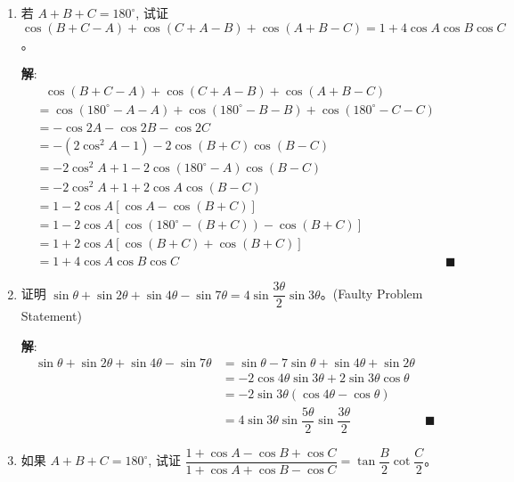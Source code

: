 \documentclass{report}
\newcommand{\sol}{\vspace{0.2cm}\textbf{解}:}
\begin{document}
\begin{enumerate}[leftmargin=*]
    \newpage
    \item 若 ${A}+{B}+{C}=180^{\circ}$, 试证 $\cos (B+C-A)+\cos (C+A-B)+\cos (A+B-C)=1+4 \cos A \cos B \cos C$。
    
    \sol{}
    \begin{align*}
       &\ \ \ \cos (B+C-A)+\cos (C+A-B)+\cos (A+B-C) \\
        &= \cos (180^{\circ}-A - A) + \cos (180^{\circ}-B - B) + \cos (180^{\circ}-C - C) \\
        & = -\cos 2A - \cos 2B - \cos 2C \\
        & = -(2\cos^2 A - 1) - 2\cos(B+C)\cos(B-C) \\
        & = -2\cos^2 A + 1 - 2\cos(180^{\circ}-A)\cos(B-C) \\
        & = -2\cos^2 A + 1 + 2\cos A\cos(B-C) \\
        & = 1 - 2\cos A[\cos A - \cos(B+C)] \\
        & = 1 - 2\cos A[\cos (180^{\circ}-(B+C)) - \cos(B+C)] \\
        & = 1 + 2\cos A[\cos(B+C) + \cos(B+C)] \\
        & = 1 + 4\cos A\cos B\cos C &\blacksquare
    \end{align*}
    \item 证明 $\sin \theta+\sin 2 \theta+\sin 4 \theta-\sin 7 \theta=4 \sin \dfrac{3 \theta}{2} \sin 3 \theta$。(Faulty Problem Statement)
    
    \sol{}
    \begin{align*}
        \sin \theta+\sin 2 \theta+\sin 4 \theta-\sin 7 \theta &= \sin \theta - 7\sin \theta + \sin 4\theta + \sin 2\theta \\
        & = -2\cos 4\theta\sin 3\theta + 2\sin 3\theta\cos\theta \\
        & = -2\sin 3\theta(\cos 4\theta - \cos \theta) \\
        & = 4\sin 3\theta\sin \dfrac{5\theta}{2}\sin \dfrac{3\theta}{2} &\blacksquare
    \end{align*}

    \item 如果 $A+B+C=180^{\circ}$, 试证 $\dfrac{1+\cos A-\cos B+\cos C}{1+\cos A+\cos B-\cos C}=\tan \dfrac{B}{2} \cot \dfrac{C}{2}$。
    

\end{enumerate}
\end{document}
